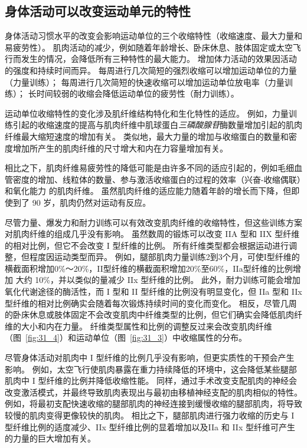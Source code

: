 \subsection{身体活动可以改变运动单元的特性}

身体活动习惯水平的改变会影响运动单位的三个收缩特性（收缩速度、最大力量和易疲劳性）。
肌肉活动的减少，例如随着年龄增长、卧床休息、肢体固定或太空飞行而发生的情况，会降低所有三种特性的最大能力。
增加体力活动的效果因活动的强度和持续时间而异。
每周进行几次简短的强烈收缩可以增加运动单位的力量（力量训练）；
每周进行几次简短的快速收缩可以增加运动单位放电率（力量训练）；
长时间较弱的收缩会降低运动单位的疲劳性（耐力训练）。


运动单位收缩特性的变化涉及肌纤维结构特化和生化特性的适应。
例如，力量训练引起的收缩速度的提高与肌肉纤维中肌球蛋白\textit{三磷酸腺苷}酶数量增加引起的肌肉纤维最大缩短速度的增加有关。
类似地，最大力量的增加与收缩蛋白的数量和密度增加所产生的肌肉纤维的尺寸增大和内在力容量增加有关。


相比之下，肌肉纤维易疲劳性的降低可能是由许多不同的适应引起的，例如毛细血管密度的增加、线粒体的数量、参与激活收缩蛋白的过程的效率（兴奋-收缩偶联）和氧化能力 的肌肉纤维。
虽然肌肉纤维的适应能力随着年龄的增长而下降，但即使到了 90 岁，肌肉仍然对运动有反应。


尽管力量、爆发力和耐力训练可以有效改变肌肉纤维的收缩特性，但这些训练方案对肌肉纤维的组成几乎没有影响。
虽然数周的锻炼可以改变 IIA 型和 IIX 型纤维的相对比例，但它不会改变 I 型纤维的比例。
所有纤维类型都会根据运动进行调整，但程度因运动类型而异。
例如，腿部肌肉力量训练2到3个月，可使I型纤维的横截面积增加0\%～20\%，II型纤维的横截面积增加20\%至60\%，IIa型纤维的比例增加 大约 10\%，并以类似的量减少 IIx 型纤维的比例。
此外，耐力训练可能会增加氧化代谢途径的酶活性，而 I 型和 II 型纤维的比例没有明显变化，但 IIa 型和 IIx 型纤维的相对比例确实会随着每次锻炼持续时间的变化而变化。
相反，尽管几周的卧床休息或肢体固定不会改变肌肉中纤维类型的比例，但它们确实会降低肌肉纤维的大小和内在力量。
纤维类型属性和比例的调整反过来会改变肌肉纤维（图~\ref{fig:31_4}）和运动单位（图~\ref{fig:31_3}）中收缩属性的分布。


尽管身体活动对肌肉中 I 型纤维的比例几乎没有影响，但更实质性的干预会产生影响。
例如，太空飞行使肌肉暴露在重力持续降低的环境中，这会降低某些腿部肌肉中 I 型纤维的比例并降低收缩性能。
同样，通过手术改变支配肌肉的神经会改变激活模式，并最终导致肌肉表现出与最初由移植神经支配的肌肉相似的特性。
例如，将最初支配快速收缩的腿部肌肉的神经连接到缓慢收缩的腿部肌肉，将导致较慢的肌肉变得更像较快的肌肉。
相比之下，腿部肌肉进行强力收缩的历史与 I 型纤维比例的适度减少、IIx 型纤维比例的显着增加以及IIa 和 IIx 型纤维可产生的力量的巨大增加有关。 



